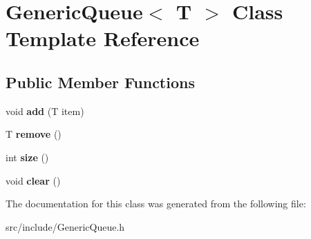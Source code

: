 \hypertarget{classGenericQueue}{\section{Generic\-Queue$<$ T $>$ Class Template Reference}
\label{classGenericQueue}
}
\subsection*{Public Member Functions}
\begin{DoxyCompactItemize}
\item 
\hypertarget{classGenericQueue_af5de20e93f3ee8d1fdd38a8ec1ae52f6}{void {\bfseries add} (T item)}\label{classGenericQueue_af5de20e93f3ee8d1fdd38a8ec1ae52f6}

\item 
\hypertarget{classGenericQueue_a15366cdc3234d238c664c82524f14c0b}{T {\bfseries remove} ()}\label{classGenericQueue_a15366cdc3234d238c664c82524f14c0b}

\item 
\hypertarget{classGenericQueue_aa94c712ca621ef5c121cd4f9c9188f67}{int {\bfseries size} ()}\label{classGenericQueue_aa94c712ca621ef5c121cd4f9c9188f67}

\item 
\hypertarget{classGenericQueue_a0fd02ceeecaf5c0903e3ee7199b183bc}{void {\bfseries clear} ()}\label{classGenericQueue_a0fd02ceeecaf5c0903e3ee7199b183bc}

\end{DoxyCompactItemize}


The documentation for this class was generated from the following file\-:\begin{DoxyCompactItemize}
\item 
src/include/Generic\-Queue.\-h\end{DoxyCompactItemize}
